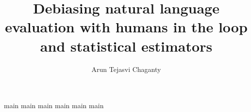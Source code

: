 \documentclass{report}
\begin{document}
\title{Debiasing natural language evaluation with humans in the loop and statistical estimators}
\author{Arun Tejasvi Chaganty}
 
\beforepreface{}


\afterpreface{}

{main}
{main}
{main}
{main}
{main}
{main}

\appendix

%


\end{document}
